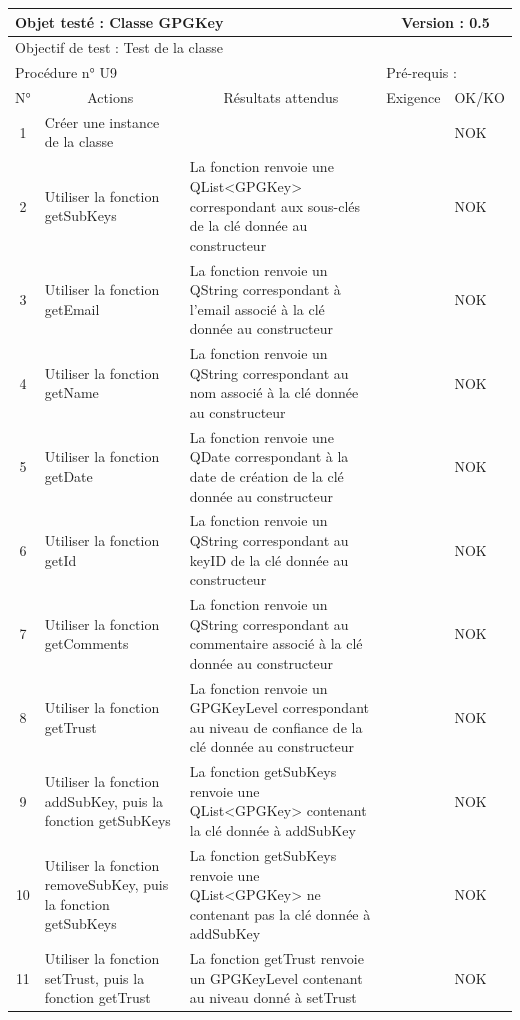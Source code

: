 \documentclass{../res/univ-projet}
\begin{document}
\begin{center}
    \begin{tabular}{|c|p{5cm}|p{5cm}|p{1.5cm}|p{1.5cm}|}
      \hline
      \multicolumn{3}{|l|}{Objet testé : Classe GPGKey} & \multicolumn{2}{c|}{Version : 0.5}\\ \hline
      \multicolumn{5}{|l|}{Objectif de test : Test de la classe}\\ \hline
      \multicolumn{3}{|l|}{Procédure n° U9} & \multicolumn{2}{p{3cm}|}{Pré-requis : }\\ \hline
      \multicolumn{1}{|c|}{N°} & \multicolumn{1}{c|}{Actions} & \multicolumn{1}{c|}{Résultats attendus} & 
      \multicolumn{1}{c|}{Exigence} & \multicolumn{1}{c|}{OK/KO}\\ \hline
      1 & Créer une instance de la classe &  &  & NOK \\
      2 & Utiliser la fonction getSubKeys & La fonction renvoie une QList<GPGKey> correspondant aux sous-clés de la clé donnée au constructeur &  & NOK \\
      3 & Utiliser la fonction getEmail & La fonction renvoie un QString correspondant à l'email associé à la clé donnée au constructeur &  & NOK \\
      4 & Utiliser la fonction getName & La fonction renvoie un QString correspondant au nom associé à la clé donnée au constructeur &  & NOK \\
      5 & Utiliser la fonction getDate & La fonction renvoie une QDate correspondant à la date de création de la clé donnée au constructeur &  & NOK \\
      6 & Utiliser la fonction getId & La fonction renvoie un QString correspondant au keyID de la clé donnée au constructeur &  & NOK \\
      7 & Utiliser la fonction getComments & La fonction renvoie un QString correspondant au commentaire associé à la clé donnée au constructeur &  & NOK \\
      8 & Utiliser la fonction getTrust & La fonction renvoie un GPGKeyLevel correspondant au niveau de confiance de la clé donnée au constructeur &  & NOK \\
      9 & Utiliser la fonction addSubKey, puis la fonction getSubKeys & La fonction getSubKeys renvoie une QList<GPGKey> contenant la clé donnée à addSubKey &  & NOK \\
      10 & Utiliser la fonction removeSubKey, puis la fonction getSubKeys & La fonction getSubKeys renvoie une QList<GPGKey> ne contenant pas la clé donnée à addSubKey &  & NOK \\ 
      11 & Utiliser la fonction setTrust, puis la fonction getTrust & La fonction getTrust renvoie un GPGKeyLevel contenant au niveau donné à setTrust &  & NOK \\ 
  \hline
    \end{tabular}
    \vskip 2.2cm


\end{center}
\end{document}
